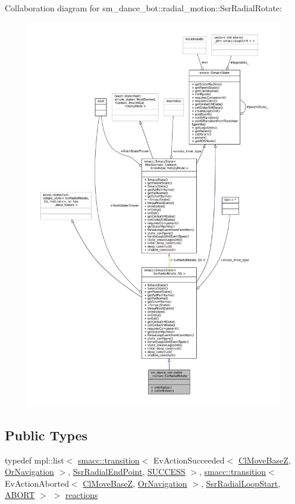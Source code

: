Collaboration diagram for sm\+\_\+dance\+\_\+bot\+:\+:radial\+\_\+motion\+:\+:Ssr\+Radial\+Rotate\+:
\nopagebreak
\begin{figure}[H]
\begin{center}
\leavevmode
\includegraphics[width=350pt]{structsm__dance__bot_1_1radial__motion_1_1SsrRadialRotate__coll__graph}
\end{center}
\end{figure}
\subsection*{Public Types}
\begin{DoxyCompactItemize}
\item 
typedef mpl\+::list$<$ \hyperlink{classsmacc_1_1transition}{smacc\+::transition}$<$ Ev\+Action\+Succeeded$<$ \hyperlink{classmove__base__z__client_1_1ClMoveBaseZ}{Cl\+Move\+BaseZ}, \hyperlink{classsm__dance__bot_1_1OrNavigation}{Or\+Navigation} $>$, \hyperlink{structsm__dance__bot_1_1radial__motion_1_1SsrRadialEndPoint}{Ssr\+Radial\+End\+Point}, \hyperlink{classSUCCESS}{S\+U\+C\+C\+E\+SS} $>$, \hyperlink{classsmacc_1_1transition}{smacc\+::transition}$<$ Ev\+Action\+Aborted$<$ \hyperlink{classmove__base__z__client_1_1ClMoveBaseZ}{Cl\+Move\+BaseZ}, \hyperlink{classsm__dance__bot_1_1OrNavigation}{Or\+Navigation} $>$, \hyperlink{structsm__dance__bot_1_1radial__motion_1_1SsrRadialLoopStart}{Ssr\+Radial\+Loop\+Start}, \hyperlink{classABORT}{A\+B\+O\+RT} $>$ $>$ \hyperlink{structsm__dance__bot_1_1radial__motion_1_1SsrRadialRotate_ae1c62735d1c8441d1660db84244985c8}{reactions}
\end{DoxyCompactItemize}
